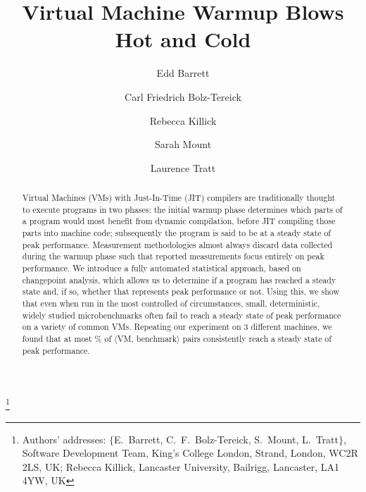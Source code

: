 \documentclass[acmsmall,screen]{acmart}
\newcommand{\vmbpair}{$\langle$VM, benchmark$\rangle$\xspace}
\begin{document}
\title{Virtual Machine Warmup Blows Hot and Cold}

\author{Edd Barrett}
\author{Carl Friedrich Bolz-Tereick}
\author{Rebecca Killick}
\author{Sarah Mount}
\author{Laurence Tratt}

%
%
%

\thanks{Authors' addresses: $\{$E.~Barrett, C.~F.~Bolz-Tereick, S.~Mount,
L.~Tratt$\}$, Software Development Team, King's College London, Strand, London,
WC2R 2LS, UK; Rebecca Killick, Lancaster University, Bailrigg, Lancaster, LA1
4YW, UK}


\begin{abstract}
Virtual Machines (VMs) with Just-In-Time (JIT) compilers are traditionally thought
to execute programs in two phases: the initial warmup phase determines
which parts of a program would most benefit from dynamic compilation, before JIT
compiling those parts into machine code; subsequently
the program is said to be at a steady state of peak performance.
Measurement methodologies almost always discard data collected during the warmup
phase such that reported measurements focus entirely on peak performance.
We introduce a fully automated statistical approach, based
on changepoint analysis, which allows us to determine if a program
has reached a steady state and, if so, whether that represents peak
performance or not. Using this, we show that even when run in the
most controlled of circumstances, small, deterministic, widely studied
microbenchmarks often fail to reach a steady state of peak performance on a
variety of common VMs. Repeating our experiment on 3 different machines, we
found that at most \maxtwo\% of
\vmbpair pairs consistently reach a steady state of peak performance.
\end{abstract}
\end{document}
